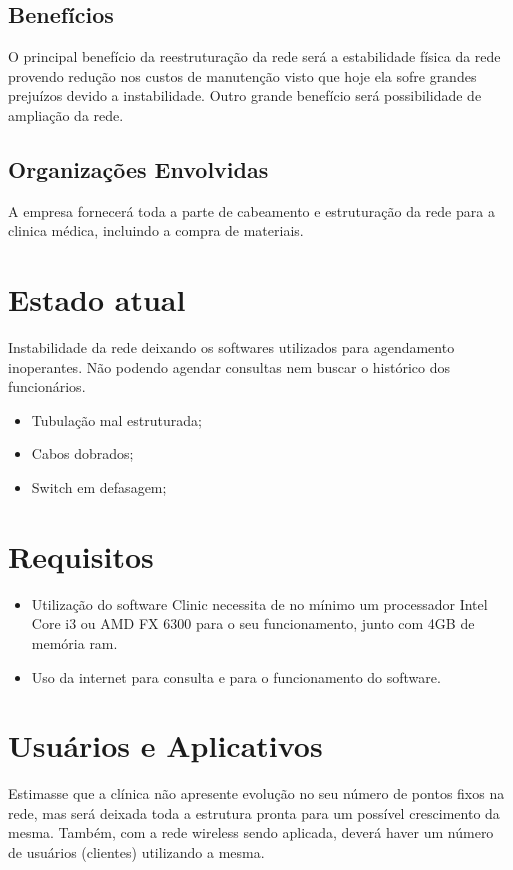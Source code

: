 \documentclass[	DIV=calc,%
							paper=a4,%
							fontsize=12pt,%
							onecolumn]{scrartcl}	 					%
\begin{document}
\subsection{Benefícios}
O principal benefício da reestruturação da rede será a estabilidade física da rede provendo redução nos custos de manutenção visto que hoje ela sofre grandes prejuízos devido a instabilidade. Outro grande benefício será possibilidade de ampliação da rede.


\subsection{Organizações Envolvidas}
A empresa fornecerá toda a parte de cabeamento e estruturação da rede para a clinica médica, incluindo a compra de materiais.


\section{Estado atual}
Instabilidade da rede deixando os softwares utilizados para agendamento inoperantes. Não podendo agendar consultas nem buscar o histórico dos funcionários.

\begin{itemize}
	\item Tubulação mal estruturada;
	
	\item Cabos dobrados; 
	
	\item Switch em defasagem;

	
\end{itemize}

\section{Requisitos}

\begin{itemize}
	\item Utilização do software Clinic necessita de no mínimo um processador Intel Core i3 ou AMD FX 6300 para o seu funcionamento, junto com 4GB de memória ram.
	
	\item Uso da internet para consulta e para o funcionamento do software.
	
\end{itemize}


\section{Usuários e Aplicativos}
Estimasse que a clínica não apresente evolução no seu número de pontos fixos na rede, mas será deixada toda a estrutura pronta para um possível crescimento da mesma. Também, com a rede wireless sendo aplicada, deverá haver um número de usuários (clientes) utilizando a mesma.
\end{document}
